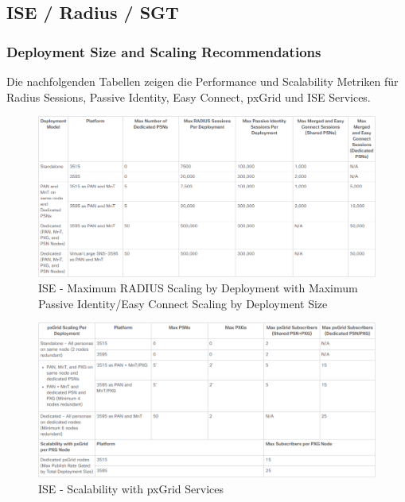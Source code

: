 \subsection{ISE / Radius / SGT}

\subsubsection{Deployment Size and Scaling Recommendations}

Die nachfolgenden Tabellen zeigen die Performance und Scalability Metriken für Radius Sessions, Passive Identity, Easy Connect, pxGrid und ISE Services.

\begin{figure}[H]
	\centering
	\includegraphics[width=1\linewidth]{img/Absicherung/ISE-MaxRadiusScaling}
	\caption{ISE - Maximum RADIUS Scaling by Deployment with Maximum Passive Identity/Easy Connect Scaling by Deployment Size \cite{ise-scale}}
	\label{fig:ISE - Maximum RADIUS Scaling}
\end{figure}

\begin{figure}[H]
	\centering
	\includegraphics[width=1\linewidth]{img/Absicherung/ISE-pxGridServicesScalability}
	\caption{ISE - Scalability with pxGrid Services \cite{ise-scale}}
	\label{fig:ISE - Scalability with pxGrid Service}
\end{figure}

